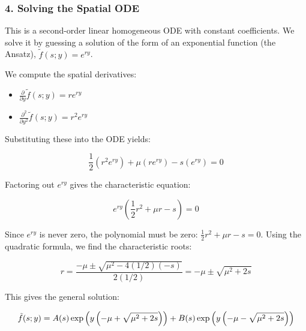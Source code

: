 \documentclass{beamer}
\begin{document}
\begin{frame}
\frametitle{4. Solving the Spatial ODE}
This is a second-order linear homogeneous ODE with constant coefficients. We solve it by guessing a solution of the form of an exponential function (the Ansatz), $\tilde{f}(s;y) = e^{ry}$.

We compute the spatial derivatives:

\begin{itemize}
  \item $\frac{\partial}{\partial y} \tilde{f}(s;y) = r e^{ry}$
  \item $\frac{\partial^2}{\partial y^2} \tilde{f}(s;y) = r^2 e^{ry}$
\end{itemize}

Substituting these into the ODE yields:

\[
\frac{1}{2}(r^2 e^{ry}) + \mu (r e^{ry}) - s(e^{ry}) = 0
\]

Factoring out $e^{ry}$ gives the characteristic equation:
\end{frame}
\begin{frame}
\[
e^{ry} \left( \frac{1}{2} r^2 + \mu r - s \right) = 0
\]

Since $e^{ry}$ is never zero, the polynomial must be zero: $\frac{1}{2} r^2 + \mu r - s = 0$. Using the quadratic formula, we find the characteristic roots:

\[
r = \frac{-\mu \pm \sqrt{\mu^2 - 4(1/2)(-s)}}{2(1/2)} = -\mu \pm \sqrt{\mu^2 + 2s}
\]

This gives the general solution:

\[
\tilde{f}(s;y) = A(s) \exp \left( y \left( -\mu + \sqrt{\mu^2 + 2s} \right) \right) + 

\hfill B(s) \exp \left( y \left( -\mu - \sqrt{\mu^2 + 2s} \right) \right)
\]
\end{frame}
\end{document}
